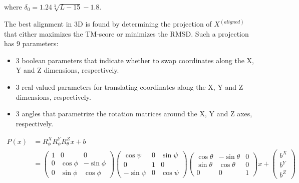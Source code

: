 where $\delta_0 = 1.24 \sqrt[3]{L - 15} - 1.8$.

The best alignment in 3D is found by determining the projection of $X^{(aligned)}$ that
either maximizes the TM-score or minimizes the RMSD.
Such a projection has 9 parameters:
\begin{itemize}
    \item 3 boolean parameters that indicate whether to swap coordinates along
    the X, Y and Z dimensions, respectively.
    \item 3 real-valued parameters for translating coordinates along the X, Y and Z
    dimensions, respectively.
    \item 3 angles that parametrize the rotation matrices around the X, Y and Z axes,
    respectively.
\end{itemize}

\begin{align*}
    P(x) & = R^X_{\phi} R^Y_{\psi} R^Z_{\theta} x + b \\
    & =
    \begin{pmatrix}
    1 & 0 & 0 \\
    0 & \cos{\phi} & -\sin{\phi} \\
    0 & \sin{\phi} & \cos{\phi}
    \end{pmatrix}
    \begin{pmatrix}
    \cos{\psi} & 0 & \sin{\psi} \\
    0 & 1 & 0 \\
    -\sin{\psi} & 0 & \cos{\psi}
    \end{pmatrix}
    \begin{pmatrix}
    \cos{\theta} & -\sin{\theta} & 0 \\
    \sin{\theta} & \cos{\theta} & 0 \\
    0 & 0 & 1
    \end{pmatrix}
    x +
    \begin{pmatrix}
    b^X \\
    b^Y \\
    b^Z
    \end{pmatrix}
\end{align*}
